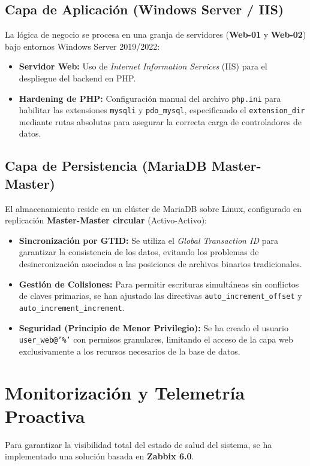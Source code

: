 \documentclass[12pt,a4paper]{article}
\begin{document}
\subsection{Capa de Aplicación (Windows Server / IIS)}
La lógica de negocio se procesa en una granja de servidores (\textbf{Web-01} y \textbf{Web-02}) bajo entornos Windows Server 2019/2022:
\begin{itemize}
    \item \textbf{Servidor Web:} Uso de \textit{Internet Information Services} (IIS) para el despliegue del backend en PHP.
    \item \textbf{Hardening de PHP:} Configuración manual del archivo \texttt{php.ini} para habilitar las extensiones \texttt{mysqli} y \texttt{pdo\_mysql}, especificando el \texttt{extension\_dir} mediante rutas absolutas para asegurar la correcta carga de controladores de datos.
\end{itemize}

\subsection{Capa de Persistencia (MariaDB Master-Master)}
El almacenamiento reside en un clúster de MariaDB sobre Linux, configurado en replicación \textbf{Master-Master circular} (Activo-Activo):
\begin{itemize}
    \item \textbf{Sincronización por GTID:} Se utiliza el \textit{Global Transaction ID} para garantizar la consistencia de los datos, evitando los problemas de desincronización asociados a las posiciones de archivos binarios tradicionales.
    \item \textbf{Gestión de Colisiones:} Para permitir escrituras simultáneas sin conflictos de claves primarias, se han ajustado las directivas \texttt{auto\_increment\_offset} y \texttt{auto\_increment\_increment}.
    \item \textbf{Seguridad (Principio de Menor Privilegio):} Se ha creado el usuario \texttt{user\_web@'\%'} con permisos granulares, limitando el acceso de la capa web exclusivamente a los recursos necesarios de la base de datos.
\end{itemize}

\newpage
\section{Monitorización y Telemetría Proactiva}
\label{Monitorizacion}

Para garantizar la visibilidad total del estado de salud del sistema, se ha implementado una solución basada en \textbf{Zabbix 6.0}.
\end{document}
